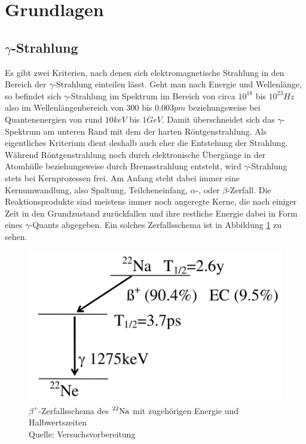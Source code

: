 \section{Grundlagen} %
\label{sec:grundlagen}
	
	
	\subsection{$\gamma$-Strahlung} %
	\label{sub:entstehung_un_deingeschaften_von_gamma_strahlung}
		
		Es gibt zwei Kriterien, nach denen sich elektromagnetische Strahlung in den Bereich der $\gamma$-Strahlung einteilen lässt.
		Geht man nach Energie und Wellenlänge, so befindet sich $\gamma$-Strahlung im Spektrum im Bereich von circa $10^{18}$ bis $10^{23} \unit{Hz} $ also im Wellenlängenbereich von $300$ bis $0.003 \unit{pm} $ beziehungsweise bei Quantenenergien von rund $10 \unit{keV}$ bis $1 \unit{GeV}$.
		Damit überschneidet sich das $\gamma$-Spektrum am unteren Rand mit dem der harten Röntgenstrahlung.
		Als eigentliches Kriterium dient deshalb auch eher die Entstehung der Strahlung.
		Während Röntgenstrahlung noch durch elektronische Übergänge in der Atomhülle beziehungsweise durch Bremsstrahlung entsteht, wird $\gamma$-Strahlung stets bei Kernprozessen frei.
		Am Anfang steht dabei immer eine Kernumwandlung, also Spaltung, Teilcheneinfang, $\alpha$-, oder $\beta$-Zerfall.
		Die Reaktionsprodukte sind meistens immer noch angeregte Kerne, die nach einiger Zeit in den Grundzustand zurückfallen und ihre restliche Energie dabei in Form eines $\gamma$-Quants abgegeben.
		Ein solches Zerfallsschema ist in Abbildung \ref{fig:dec-scheme} zu sehen.

		\begin{figure}[htb]
			\centering
			\includegraphics[scale=0.28]{pic/na-22-decay-scheme.png}
			\caption{ $\beta^+ $-Zerfallsschema des $ \prescript{22}{}{\mathrm{Na}} $ mit zugehörigen Energie und Halbwertszeiten \\
			Quelle: Versuchsvorbereitung}
			\label{fig:dec-scheme}
		\end{figure}

